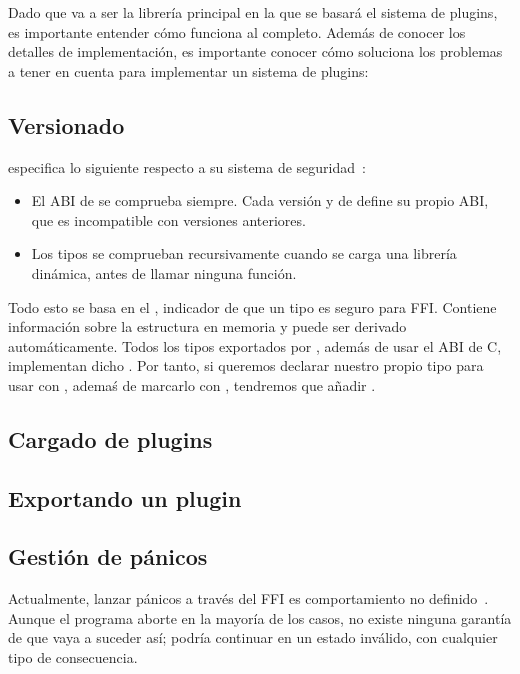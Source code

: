 Dado que \abistable va a ser la librería principal en la que se basará el
sistema de plugins, es importante entender cómo funciona al completo. Además de
conocer los detalles de implementación, es importante conocer cómo \abistable
soluciona los problemas a tener en cuenta para implementar un sistema de
plugins:

\subsection{Versionado}

\abistable especifica lo siguiente respecto a su sistema de
seguridad~\cite{abistable_safety}:

\begin{itemize}
    \item El ABI de \abistable se comprueba siempre. Cada versión  y
         de \abistable define su propio ABI, que es incompatible
        con versiones anteriores.

    \item Los tipos se comprueban recursivamente cuando se carga una librería
        dinámica, antes de llamar ninguna función.

\end{itemize}

Todo esto se basa en el \trait {}, indicador de que un tipo es
seguro para FFI. Contiene información sobre la estructura en memoria y puede ser
derivado automáticamente. Todos los tipos exportados por \abistable, además de
usar el ABI de C, implementan dicho \trait. Por tanto, si queremos declarar
nuestro propio tipo para usar con \abistable, ademaś de marcarlo con
\rust{#[repr(C)]}, tendremos que añadir .

\subsection{Cargado de plugins}

\subsection{Exportando un plugin}

\subsection{Gestión de pánicos}

Actualmente, lanzar pánicos a través del FFI es comportamiento no
definido~\cite[FFI and Panics]{nomicon}. Aunque el programa aborte en la mayoría
de los casos, no existe ninguna garantía de que vaya a suceder así; podría
continuar en un estado inválido, con cualquier tipo de consecuencia.

